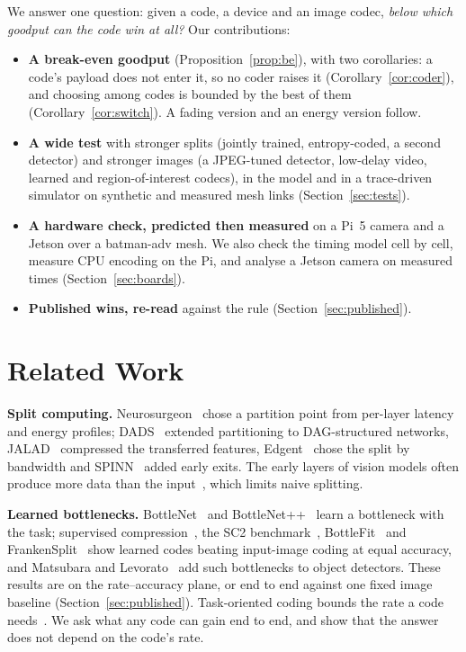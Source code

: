 \documentclass[conference,10pt]{IEEEtran}
\begin{document}
We answer one question: given a code, a device and an image codec, \emph{below which goodput can the code win at
all?} Our contributions:
\begin{itemize}
\item \textbf{A break-even goodput} (Proposition~\ref{prop:be}), with two corollaries: a code's payload does not enter
it, so no coder raises it (Corollary~\ref{cor:coder}), and choosing among codes is bounded by the best of them
(Corollary~\ref{cor:switch}). A fading version and an energy version follow.
\item \textbf{A wide test} with stronger splits (jointly trained, entropy-coded, a second detector) and stronger images
(a JPEG-tuned detector, low-delay video, learned and region-of-interest codecs), in the model and in a trace-driven
simulator on synthetic and measured mesh links (Section~\ref{sec:tests}).
\item \textbf{A hardware check, predicted then measured} on a Pi~5 camera and a Jetson over a batman-adv mesh. We also
check the timing model cell by cell, measure CPU encoding on the Pi, and analyse a Jetson camera on measured times
(Section~\ref{sec:boards}).
\item \textbf{Published wins, re-read} against the rule (Section~\ref{sec:published}).
\end{itemize}

\section{Related Work}\label{sec:related}
\textbf{Split computing.} Neurosurgeon~\cite{kang2017neurosurgeon} chose a partition point from per-layer latency and
energy profiles; DADS~\cite{hu2019dads} extended partitioning to DAG-structured networks, JALAD~\cite{li2018jalad}
compressed the transferred features, Edgent~\cite{li2020edgent} chose the split by bandwidth and SPINN~\cite{laskaridis2020spinn}
added early exits. The early layers of vision models often produce more data than the input~\cite{matsubara2022survey},
which limits naive splitting.

\textbf{Learned bottlenecks.} BottleNet~\cite{eshratifar2019bottlenet} and BottleNet++~\cite{shao2020bottlenetpp} learn a
bottleneck with the task; supervised compression~\cite{matsubara2022supervised}, the SC2 benchmark~\cite{matsubara2023sc2},
BottleFit~\cite{matsubara2022bottlefit} and FrankenSplit~\cite{furutanpey2024frankensplit} show learned codes beating
input-image coding at equal accuracy, and Matsubara and Levorato~\cite{matsubara2020complex,matsubara2021neural} add
such bottlenecks to object detectors. These results are on the rate--accuracy plane, or end to end against one fixed
image baseline (Section~\ref{sec:published}). Task-oriented coding bounds the rate a code
needs~\cite{shao2022taskoriented,tosc2026limits}. We ask what any code can gain end to end, and show that the answer does
not depend on the code's rate.
\end{document}
